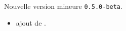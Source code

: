 Nouvelle version mineure \verb+0.5.0-beta+.

\begin{itemize}[itemsep=.5em]
    \item {}
          ajout de .
\end{itemize}

\separation